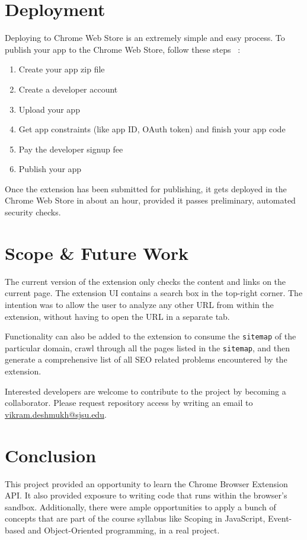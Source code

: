 \documentclass[14pt]{article}
\newcommand{\codeword}{\texttt}
\begin{document}
\smallskip

\section{Deployment}
Deploying to Chrome Web Store is an extremely simple and easy process. To publish your app to the Chrome Web Store, follow these steps ~\cite{publishing}:

\begin{enumerate}
  \item{Create your app zip file}
  \item{Create a developer account}
  \item{Upload your app}
  \item{Get app constraints (like app ID, OAuth token) and finish your app code}
  \item{Pay the developer signup fee}
  \item{Publish your app}
\end{enumerate}

Once the extension has been submitted for publishing, it gets deployed in the Chrome Web Store in about an hour, provided it passes preliminary, automated security checks.

\smallskip

\smallskip


\section{Scope \& Future Work}
The current version of the extension only checks the content and links on the current page. The extension UI contains a search box in the top-right corner. The intention was to allow the user to analyze any other URL from within the extension, without having to open the URL in a separate tab. 

Functionality can also be added to the extension to consume the \codeword{sitemap} of the particular domain, crawl through all the pages listed in the \codeword{sitemap}, and then generate a comprehensive list of all SEO related problems encountered by the extension.

Interested developers are welcome to contribute to the project by becoming a collaborator. Please request repository access by writing an email to \href{mailto:vikram.deshmukh@sjsu.edu}{vikram.deshmukh@sjsu.edu}.

\smallskip

\section{Conclusion}
This project provided an opportunity to learn the Chrome Browser Extension API. It also provided exposure to writing code that runs within the browser's sandbox. Additionally, there were ample opportunities to apply a bunch of concepts that are part of the course syllabus like Scoping in JavaScript, Event-based and Object-Oriented programming, in a real project.

\smallskip




\end{document}
